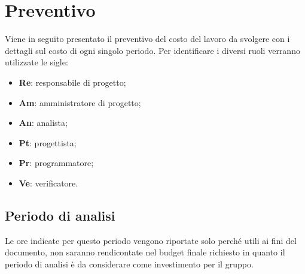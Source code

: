 \textit{}\section{Preventivo} %
Viene in seguito presentato il preventivo del costo del lavoro da svolgere con i dettagli sul costo di ogni singolo periodo.
Per identificare i diversi ruoli verranno utilizzate le sigle:
\begin{itemize}
	\item \textbf{Re}: responsabile di progetto\glo;
	\item \textbf{Am}: amministratore di progetto\glo;
	\item \textbf{An}: analista;
	\item \textbf{Pt}: progettista;
	\item \textbf{Pr}: programmatore;
	\item \textbf{Ve}: verificatore.
\end{itemize}
	\subsection{Periodo di analisi}
	Le ore indicate per questo periodo vengono riportate solo perché utili ai fini del documento, non saranno rendicontate nel budget finale richiesto in quanto il periodo di analisi è da considerare come investimento per il gruppo.
	\pagebreak

